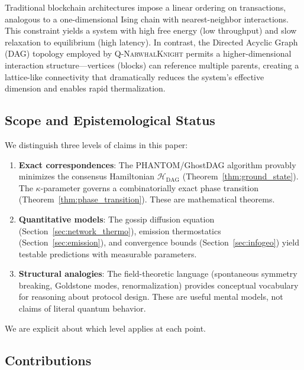 \documentclass[12pt,a4paper,twocolumn]{article}
\newcommand{\qnk}{\textsc{Q-NarwhalKnight}}
\newcommand{\Hdag}{\mathcal{H}_{\mathrm{DAG}}}
\newcommand{\kparam}{\kappa}
\begin{document}
Traditional blockchain architectures impose a linear ordering on transactions, analogous to a one-dimensional Ising chain with nearest-neighbor interactions. This constraint yields a system with high free energy (low throughput) and slow relaxation to equilibrium (high latency). In contrast, the Directed Acyclic Graph (DAG) topology employed by \qnk{} permits a higher-dimensional interaction structure---vertices (blocks) can reference multiple parents, creating a lattice-like connectivity that dramatically reduces the system's effective dimension and enables rapid thermalization.

\subsection{Scope and Epistemological Status}

We distinguish three levels of claims in this paper:
\begin{enumerate}[leftmargin=*,itemsep=2pt]
\item \textbf{Exact correspondences}: The PHANTOM/GhostDAG algorithm provably minimizes the consensus Hamiltonian $\Hdag$ (Theorem~\ref{thm:ground_state}). The $\kparam$-parameter governs a combinatorially exact phase transition (Theorem~\ref{thm:phase_transition}). These are mathematical theorems.

\item \textbf{Quantitative models}: The gossip diffusion equation (Section~\ref{sec:network_thermo}), emission thermostatics (Section~\ref{sec:emission}), and convergence bounds (Section~\ref{sec:infogeo}) yield testable predictions with measurable parameters.

\item \textbf{Structural analogies}: The field-theoretic language (spontaneous symmetry breaking, Goldstone modes, renormalization) provides conceptual vocabulary for reasoning about protocol design. These are useful mental models, not claims of literal quantum behavior.
\end{enumerate}

We are explicit about which level applies at each point.

\subsection{Contributions}
\end{document}
